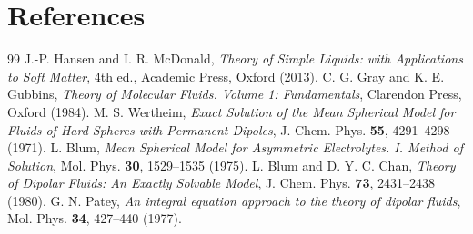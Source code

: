 \documentclass[11pt,a4paper]{article}
\begin{document}
\section*{References}
\begin{thebibliography}{99}
 J.-P. Hansen and I. R. McDonald, \textit{Theory of Simple Liquids: with Applications to Soft Matter}, 4th ed., Academic Press, Oxford (2013).
 C. G. Gray and K. E. Gubbins, \textit{Theory of Molecular Fluids. Volume 1: Fundamentals}, Clarendon Press, Oxford (1984).
 M. S. Wertheim, \textit{Exact Solution of the Mean Spherical Model for Fluids of Hard Spheres with Permanent Dipoles}, J. Chem. Phys. \textbf{55}, 4291--4298 (1971).
 L. Blum, \textit{Mean Spherical Model for Asymmetric Electrolytes. I. Method of Solution}, Mol. Phys. \textbf{30}, 1529--1535 (1975).
 L. Blum and D. Y. C. Chan, \textit{Theory of Dipolar Fluids: An Exactly Solvable Model}, J. Chem. Phys. \textbf{73}, 2431--2438 (1980).
 G. N. Patey, \textit{An integral equation approach to the theory of dipolar fluids}, Mol. Phys. \textbf{34}, 427--440 (1977).
\end{thebibliography}
\end{document}
